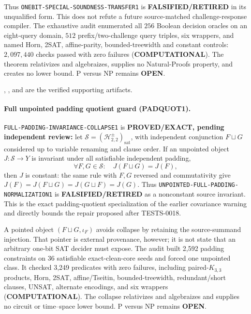 \documentclass[11pt]{article}
\begin{document}
Thus \texttt{ONEBIT-SPECIAL-SOUNDNESS-TRANSFER1} is
\textbf{FALSIFIED/RETIRED} in its unqualified form.  This does not refute a
future source-matched challenge-response compiler.  The exhaustive audit
enumerated all \(256\) Boolean decision oracles on an eight-query domain,
\(512\) prefix/two-challenge query triples, six wrappers, and named Horn,
2SAT, affine-parity, bounded-treewidth and constant controls:
\(2{,}097{,}440\) checks passed with zero failures
(\textbf{COMPUTATIONAL}).  The theorem relativizes and algebraizes, supplies no
Natural-Proofs property, and creates no lower bound.  P versus NP remains
\textbf{OPEN}.

,
, and
are the verified supporting artifacts.

\paragraph{Full unpointed padding quotient guard (PADQUOT1).}
\texttt{FULL-PADDING-INVARIANCE-COLLAPSE1} is
\textbf{PROVED/EXACT, pending independent review:} let
\(\mathcal S=(\mathcal H_{2,2}^{\pm})_{\mathrm{sat}}\), with independent
conjunction \(F\sqcup G\) considered up to variable renaming and clause
order.  If an unpointed object \(J:\mathcal S\to Y\) is invariant under all
satisfiable independent padding,
\[
 \forall F,G\in\mathcal S:\quad J(F\sqcup G)=J(F),
\]
then \(J\) is constant: the same rule with \(F,G\) reversed and commutativity
give \(J(F)=J(F\sqcup G)=J(G\sqcup F)=J(G)\).  Thus
\texttt{UNPOINTED-FULL-PADDING-NORMALIZATION1} is
\textbf{FALSIFIED/RETIRED} as a nonconstant source invariant.  This is the
exact padding-quotient specialization of the earlier covariance warning and
directly bounds the repair proposed after TESTS-0018.

A pointed object \((F\sqcup G,\iota_F)\) avoids collapse by retaining the
source-summand injection.  That pointer is external provenance, however; it
is not state that an arbitrary one-bit SAT decider must expose.  The audit
built 2,592 padding constraints on 36 satisfiable exact-clean-core seeds and
forced one unpointed class.  It checked 3,249 predicates with zero failures,
including paired-\(K_{3,3}\) products, Horn, 2SAT, affine/Tseitin,
bounded-treewidth, redundant/short clauses, UNSAT, alternate encodings, and
six wrappers (\textbf{COMPUTATIONAL}).  The collapse relativizes and
algebraizes and supplies no circuit or time--space lower bound.  P versus NP
remains \textbf{OPEN}.
\end{document}
